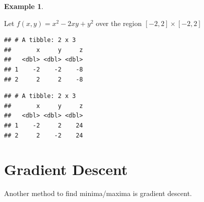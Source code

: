 \documentclass[
]{book}
\newenvironment{Shaded}{\begin{snugshade}}{\end{snugshade}}
\newcommand{\CommentTok}[1]{\textcolor[rgb]{0.56,0.35,0.01}{\textit{#1}}}
\newcommand{\ControlFlowTok}[1]{\textcolor[rgb]{0.13,0.29,0.53}{\textbf{#1}}}
\newcommand{\DataTypeTok}[1]{\textcolor[rgb]{0.13,0.29,0.53}{#1}}
\newcommand{\DecValTok}[1]{\textcolor[rgb]{0.00,0.00,0.81}{#1}}
\newcommand{\KeywordTok}[1]{\textcolor[rgb]{0.13,0.29,0.53}{\textbf{#1}}}
\newcommand{\NormalTok}[1]{#1}
\newcommand{\OperatorTok}[1]{\textcolor[rgb]{0.81,0.36,0.00}{\textbf{#1}}}
\newcommand{\StringTok}[1]{\textcolor[rgb]{0.31,0.60,0.02}{#1}}
\theoremstyle{definition}
\theoremstyle{definition}
\newtheorem{example}{Example}[chapter]
\theoremstyle{definition}
\theoremstyle{remark}
\begin{document}
\begin{example}
\protect\hypertarget{exm:unlabeled-div-229}{}\label{exm:unlabeled-div-229}

Let \(f(x, y) = x^2 - 2xy + y^2\) over the region \([-2,2]\times[-2, 2]\)

\begin{Shaded}
\end{Shaded}

\begin{verbatim}
## # A tibble: 2 x 3
##       x     y     z
##   <dbl> <dbl> <dbl>
## 1    -2    -2    -8
## 2     2     2    -8
\end{verbatim}

\begin{Shaded}
\end{Shaded}

\begin{verbatim}
## # A tibble: 2 x 3
##       x     y     z
##   <dbl> <dbl> <dbl>
## 1    -2     2    24
## 2     2    -2    24
\end{verbatim}

\end{example}

\hypertarget{gradient-descent}{%
\section{Gradient Descent}\label{gradient-descent}}

Another method to find minima/maxima is gradient descent.

  
\end{document}
